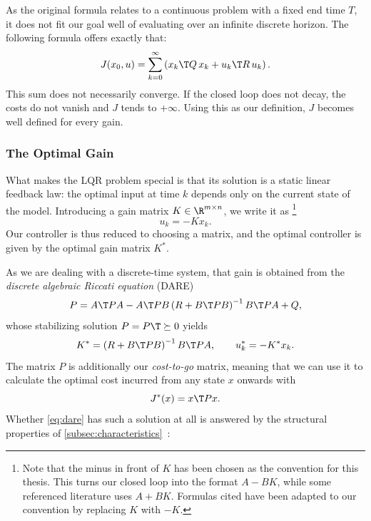 As the original formula relates to a continuous problem with a fixed end time $T$,
it does not fit our goal well of evaluating over an infinite discrete horizon.
The following formula offers exactly that:
\begin{equation}
    \label{eq:lqr-cost-infinite}
    J(x_0, u) = \sum_{k=0}^{\infty} \left( x_k\T Q\, x_k + u_k\T R\, u_k \right) .
\end{equation}
This sum does not necessarily converge. If the closed loop
does not decay, the costs do not vanish and $J$ tends to $+\infty$. 
Using this as our definition, $J$ becomes well defined for every gain.

\subsubsection{The Optimal Gain}
\label{subsubsec:lqr-optimal}

What makes the LQR problem special is that its solution is a static linear feedback
law: the optimal input at time $k$ depends only on the current state of the model.
Introducing a gain matrix $K \in \R^{m \times n}$, we write it as
\footnote{Note that the minus in front of $K$ has been chosen as the convention for this thesis.
This turns our closed loop into the format $A - BK$, while some referenced literature
uses $A + BK$. Formulas cited have been adapted to our convention by replacing $K$ with $-K$.
}
\begin{equation}
    \label{eq:feedback-law}
    u_k = -K x_k .
\end{equation}
Our controller is thus reduced to choosing a matrix, and the
optimal controller is given by the optimal gain matrix $K^{*}$.

As we are dealing with a discrete-time system, that gain is obtained from the
\emph{discrete algebraic Riccati equation} (DARE)
\begin{equation}
    \label{eq:dare}
    P = A\T P A - A\T P B \left( R + B\T P B \right)^{-1} B\T P A + Q ,
\end{equation}
whose stabilizing solution $P = P\T \succeq 0$ yields
\begin{equation}
    \label{eq:optimal-gain}
    K^{*} = \left( R + B\T P B \right)^{-1} B\T P A ,
    \qquad
    u_k^{*} = -K^{*} x_k .
\end{equation}
The matrix $P$ is additionally our
\emph{cost-to-go} matrix, meaning that we can use it to calculate the optimal cost 
incurred from any state $x$ onwards with
\begin{equation}
    \label{eq:cost-to-go}
    J^{*}(x) = x\T P x .
\end{equation}
Whether \eqref{eq:dare} has such a solution at all is answered by the structural
properties of \cref{subsec:characteristics}~:

